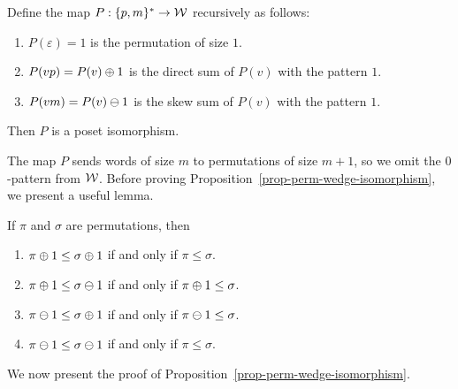 \begin{proposition}
\label{prop-perm-wedge-isomorphism}
Define the map $P: \{p, m\}^\ast \to \mathcal{W}$ recursively as follows:
\begin{enumerate}
	\item $P(\varepsilon) = 1$ is the permutation of size $1$.
	\item $P(vp) = P(v) \oplus 1$ is the direct sum of $P(v)$ with the pattern $1$.
	\item $P(vm) = P(v) \ominus 1$ is the skew sum of $P(v)$ with the pattern $1$.
\end{enumerate}
Then $P$ is a poset isomorphism.
\end{proposition}

The map $P$ sends words of size $m$ to permutations of size $m+1$, so we omit the $0$-pattern from $\mathcal{W}$. Before proving Proposition~\ref{prop-perm-wedge-isomorphism}, we present a useful lemma.
\begin{lemma}
\label{lemma-perm-sum}
If $\pi$ and $\sigma$ are permutations, then
\begin{enumerate}
	\item $\pi \oplus 1 \le \sigma \oplus 1$ if and only if $\pi              \le \sigma$.
	\item $\pi \oplus 1 \le \sigma \ominus   1$ if and only if $\pi \oplus 1 \le \sigma$.
	\item $\pi \ominus   1 \le \sigma \oplus 1$ if and only if $\pi \ominus   1 \le \sigma$.
	\item $\pi \ominus   1 \le \sigma \ominus   1$ if and only if $\pi              \le \sigma$.
\end{enumerate}
\end{lemma}

We now present the proof of Proposition~\ref{prop-perm-wedge-isomorphism}.

